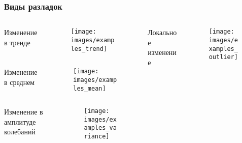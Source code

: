 \documentclass[intlimits, 9pt, unicode]{beamer}
\begin{document}
\begin{frame}
    \frametitle{Виды разладок}

\begin{columns}
 \begin{column}{0.5\textwidth}

  \begin{columns}
      \begin{column}{0.3\textwidth}
      \centering
      Изменение в тренде
      \end{column}
      \begin{column}{0.5\textwidth}
      \begin{figure}
		\texttt{[image: images/examples\_trend]}
	\end{figure}
	\end{column}
     \end{columns}

  \begin{columns}
      \begin{column}{0.3\textwidth}
      \centering
      Изменение в среднем
      \end{column}
      \begin{column}{0.5\textwidth}
      \begin{figure}
		\texttt{[image: images/examples\_mean]}
	\end{figure}
	\end{column}
     \end{columns}

  \begin{columns}
      \begin{column}{0.3\textwidth}
      \centering
      Изменение в амплитуде колебаний
      \end{column}
      \begin{column}{0.5\textwidth}
      \begin{figure}
		\texttt{[image: images/examples\_variance]}
	\end{figure}
	\end{column}
     \end{columns}

	\end{column}

 \begin{column}{0.5\textwidth}

  \begin{columns}
      \begin{column}{0.3\textwidth}
      \centering
      Локальное изменение
      \end{column}
      \begin{column}{0.5\textwidth}
      \begin{figure}
		\texttt{[image: images/examples\_outlier]}
	\end{figure}
	\end{column}
     \end{columns}


\end{column}
\end{columns}
\end{frame}
\end{document}
